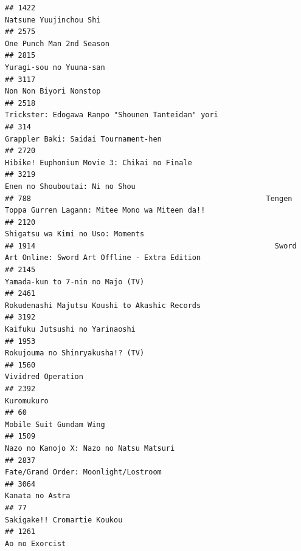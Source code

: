 \documentclass[
]{article}
\begin{document}
\begin{verbatim}
## 1422                                                                                    Natsume Yuujinchou Shi
## 2575                                                                                  One Punch Man 2nd Season
## 2815                                                                                   Yuragi-sou no Yuuna-san
## 3117                                                                                    Non Non Biyori Nonstop
## 2518                                                         Trickster: Edogawa Ranpo "Shounen Tanteidan" yori
## 314                                                                       Grappler Baki: Saidai Tournament-hen
## 2720                                                               Hibike! Euphonium Movie 3: Chikai no Finale
## 3219                                                                            Enen no Shouboutai: Ni no Shou
## 788                                                      Tengen Toppa Gurren Lagann: Mitee Mono wa Miteen da!!
## 2120                                                                          Shigatsu wa Kimi no Uso: Moments
## 1914                                                       Sword Art Online: Sword Art Offline - Extra Edition
## 2145                                                                          Yamada-kun to 7-nin no Majo (TV)
## 2461                                                             Rokudenashi Majutsu Koushi to Akashic Records
## 3192                                                                            Kaifuku Jutsushi no Yarinaoshi
## 1953                                                                          Rokujouma no Shinryakusha!? (TV)
## 1560                                                                                        Vividred Operation
## 2392                                                                                                Kuromukuro
## 60                                                                                     Mobile Suit Gundam Wing
## 1509                                                                   Nazo no Kanojo X: Nazo no Natsu Matsuri
## 2837                                                                      Fate/Grand Order: Moonlight/Lostroom
## 3064                                                                                           Kanata no Astra
## 77                                                                                 Sakigake!! Cromartie Koukou
## 1261                                                                                            Ao no Exorcist

\end{verbatim}
\end{document}
